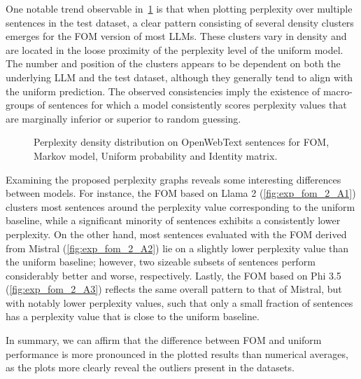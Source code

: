 One notable trend observable in~\cref{fig:exp_fom_2_A} is that when plotting perplexity over multiple sentences in the test dataset, a clear pattern consisting of several density clusters emerges for the FOM version of most LLMs.
These clusters vary in density and are located in the loose proximity of the perplexity level of the uniform model.
The number and position of the clusters appears to be dependent on both the underlying LLM and the test dataset, although they generally tend to align with the uniform prediction.
The observed consistencies imply the existence of macro-groups of sentences for which a model consistently scores perplexity values that are marginally inferior or superior to random guessing.

\begin{figure}[t!]
    \centering
    \quad
    \quad
    \caption{Perplexity density distribution on OpenWebText sentences for FOM, Markov model, Uniform probability and Identity matrix.}
    \label{fig:exp_fom_2_A}
\end{figure}

Examining the proposed perplexity graphs reveals some interesting differences between models.
For instance, the FOM based on Llama 2 (\cref{fig:exp_fom_2_A1}) clusters most sentences around the perplexity value corresponding to the uniform baseline, while a significant minority of sentences exhibits a consistently lower perplexity.
On the other hand, most sentences evaluated with the FOM derived from Mistral (\cref{fig:exp_fom_2_A2}) lie on a slightly lower perplexity value than the uniform baseline; however, two sizeable subsets of sentences perform considerably better and worse, respectively.
Lastly, the FOM based on Phi 3.5 (\cref{fig:exp_fom_2_A3}) reflects the same overall pattern to that of Mistral, but with notably lower perplexity values, such that only a small fraction of sentences has a perplexity value that is close to the uniform baseline.

In summary, we can affirm that the difference between FOM and uniform performance is more pronounced in the plotted results than numerical averages, as the plots more clearly reveal the outliers present in the datasets.

